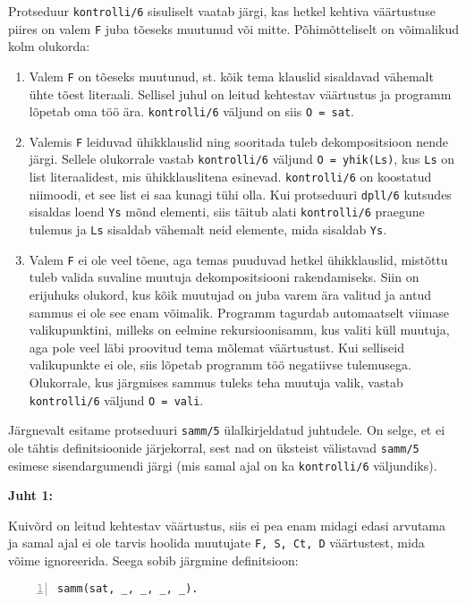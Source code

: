 Protseduur \texttt{kontrolli/6} sisuliselt vaatab järgi, kas hetkel kehtiva
väärtustuse piires on valem \texttt{F} juba tõeseks muutunud või mitte.
Põhimõtteliselt on võimalikud kolm olukorda:

\begin{enumerate}
  \item Valem \texttt{F} on tõeseks muutunud, st. kõik tema klauslid sisaldavad
  vähemalt ühte tõest literaali. Sellisel juhul on leitud kehtestav väärtustus
  ja programm lõpetab oma töö ära. \texttt{kontrolli/6} väljund on siis
  \texttt{O = sat}.
  \item Valemis \texttt{F} leiduvad ühikklauslid ning sooritada tuleb
  dekompositsioon nende järgi. Sellele olukorrale vastab \texttt{kontrolli/6}
  väljund \texttt{O = yhik(Ls)}, kus \texttt{Ls} on list literaalidest, mis
  ühikklauslitena esinevad. \texttt{kontrolli/6} on koostatud niimoodi, et see
  list ei saa kunagi tühi olla. Kui protseduuri \texttt{dpll/6} kutsudes
  sisaldas loend \texttt{Ys} mõnd elementi, siis täitub alati
  \texttt{kontrolli/6} praegune tulemus ja \texttt{Ls} sisaldab vähemalt neid
  elemente, mida sisaldab \texttt{Ys}.
  \item Valem \texttt{F} ei ole veel tõene, aga temas puuduvad hetkel
  ühikklauslid, mistõttu tuleb valida suvaline muutuja dekompositsiooni
  rakendamiseks. Siin on erijuhuks olukord, kus kõik muutujad on juba varem ära
  valitud ja antud sammus ei ole see enam võimalik. Programm tagurdab
  automaatselt viimase valikupunktini, milleks on eelmine
  rekursioonisamm, kus valiti küll muutuja, aga pole veel läbi proovitud tema
  mõlemat väärtustust. Kui selliseid valikupunkte ei ole, siis lõpetab programm
  töö negatiivse tulemusega. Olukorrale, kus järgmises sammus tuleks teha
  muutuja valik, vastab \texttt{kontrolli/6} väljund \texttt{O = vali}.
\end{enumerate}

Järgnevalt esitame protseduuri \texttt{samm/5} ülalkirjeldatud juhtudele. On
selge, et ei ole tähtis definitsioonide järjekorral, sest nad on üksteist
välistavad \texttt{samm/5} esimese sisendargumendi järgi (mis samal ajal on ka
\texttt{kontrolli/6} väljundiks).

\textbf{Juht 1:}

Kuivõrd on leitud kehtestav väärtustus, siis ei pea enam midagi edasi arvutama
ja samal ajal ei ole tarvis hoolida muutujate \texttt{F, S, Ct, D} väärtustest,
mida võime ignoreerida. Seega sobib järgmine definitsioon:

\begin{lstlisting}[numbers=left,xleftmargin=1cm,basicstyle=\tt]
samm(sat, _, _, _, _).
\end{lstlisting}

